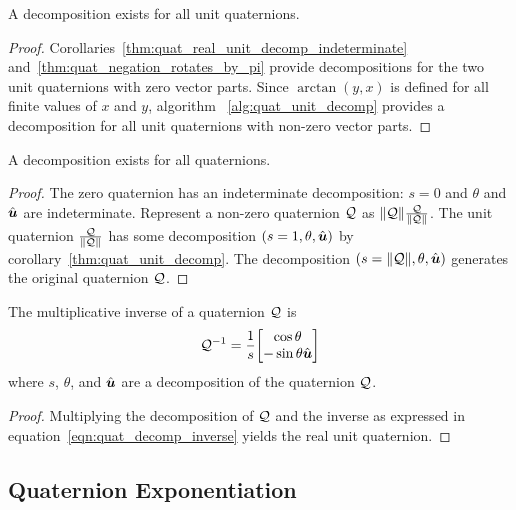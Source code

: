 \begin{corollary}\label{thm:quat_unit_decomp}
A decomposition exists for all unit quaternions.
\end{corollary}
\begin{proof}
Corollaries~\ref{thm:quat_real_unit_decomp_indeterminate}
and~\ref{thm:quat_negation_rotates_by_pi}
provide decompositions for the two unit quaternions with zero vector parts.
Since $\arctan(y,x)$ is defined for all finite values of $x$ and $y$,
algorithm ~\ref{alg:quat_unit_decomp}
provides a decomposition for all unit quaternions with non-zero vector parts.
\end{proof}

\begin{corollary}\label{thm:quat_decomp}
A decomposition exists for all quaternions.
\end{corollary}
\begin{proof}
The zero quaternion has an indeterminate decomposition: $s=0$ and
$\theta$ and $\hat{\boldsymbol{u}}$ are indeterminate.
Represent a non-zero quaternion $\mathcal{Q}$ as
$\lVert\mathcal{Q}\rVert \frac{\mathcal{Q}}{\lVert\mathcal{Q}\rVert}$.
The unit quaternion $\frac{\mathcal{Q}}{\lVert\mathcal{Q}\rVert}$ has some decomposition
$(s=1, \theta, \hat{\boldsymbol{u}})$ by corollary~\ref{thm:quat_unit_decomp}.
The decomposition $(s=\lVert\mathcal{Q}\rVert, \theta, \hat{\boldsymbol{u}})$ generates the
original quaternion $\mathcal{Q}$.
\end{proof}

\begin{corollary}\label{thm:quat_decomp_inverse}
The multiplicative inverse of a quaternion $\mathcal{Q}$ is
\begin{equation}
  \quat Q^{-1} =
    \frac{1}{s} \quatsv {\cos \theta}{- \sin \theta \vhat u}
  \label{eqn:quat_decomp_inverse}
\end{equation}
where $s$, $\theta$, and $\hat{\boldsymbol{u}}$ are a decomposition of the
quaternion $\mathcal{Q}$.
\end{corollary}
\begin{proof}
Multiplying the decomposition of $\mathcal{Q}$ and the inverse as expressed in
equation~\eqref{eqn:quat_decomp_inverse} yields the real unit quaternion.
\end{proof}

\subsection{Quaternion Exponentiation}\label{sec:app_exponentiation}

